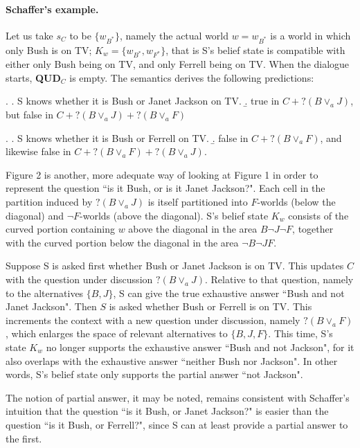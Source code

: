 
\paragraph{Schaffer's example.} Let us take $s_C$ to be $\{w_{B^{*}}\}$, namely
the actual world $w=w_{B^{*}}$ is a world in which only Bush is on
TV; $K_w= \{w_{B^{*}}, w_{F^{*}}\}$, that is S's belief state is
compatible with either only Bush being on TV, and only Ferrell
being on TV. When the dialogue starts, {\bf QUD$_C$}  is empty. The semantics
derives the following predictions:

\ex. \a. S knows whether it is Bush or Janet Jackson on TV. \b.
true in $C + ?(B \vee_a J)$, but false in $C +  ? (B \vee_a J) + ?
(B \vee_a F)$

\ex. \a. S knows whether it is Bush or Ferrell on TV. \b. false in
$C + ?(B \vee_a F)$, and likewise false in $C + ?(B \vee_a F) +
?(B\vee_a J)$.

\enlargethispage{1cm}



Figure 2 is another, more adequate way of looking at Figure 1 in
order to represent the question ``is it Bush, or is it Janet
Jackson?". Each cell in the partition induced by $?(B\vee_{a} J)$
is itself partitioned into $F$-worlds (below the diagonal) and
$\neg F$-worlds (above the diagonal). S's belief state $K_w$
consists of the curved portion containing $w$ above the diagonal
in the area $B\neg J \neg F$, together with the curved portion
below the diagonal in the area $\neg B \neg J F$.

Suppose S is asked first whether Bush or Janet Jackson is on TV.
This updates $C$ with the question under discussion $?(B\vee_a
J)$. Relative to that question, namely to the alternatives
$\{B,J\}$, S can give the true exhaustive answer ``Bush and not
Janet Jackson". Then $S$ is asked whether Bush or Ferrell is on
TV. This increments the context with a new question under
discussion, namely $?(B \vee_a F)$, which enlarges the space of
relevant alternatives to $\{B,J,F\}$. This time, S's state $K_w$
no longer supports the exhaustive answer ``Bush and not Jackson",
for it also overlaps with the exhaustive answer ``neither Bush nor
Jackson". In other words, S's belief state only supports the
partial answer ``not Jackson".

The notion of partial answer, it may be noted, remains consistent
with Schaffer's intuition that the question ``is it Bush, or Janet
Jackson?" is easier than the question ``is it Bush, or Ferrell?",
since S can at least provide a partial answer to the first.

